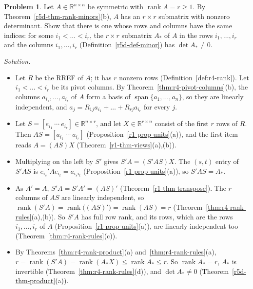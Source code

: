 \documentclass[12pt]{article}
\def\unitnumber{1}
\newcommand{\R}{\mathbb R}
\DeclareMathOperator{\rank}{rank}
\DeclareMathOperator{\Span}{span}
\theoremstyle{definition}
\newtheorem{problem}{Problem}
\newenvironment{solution}{\par\noindent\textit{Solution.}\ }{\par\smallskip}
\begin{document}
\begin{problem}\label{r5d-ex-pr-sym-minor}
Let \(A\in\R^{n\times n}\) be symmetric with \(\rank A=r\geqslant1\). By Theorem~\ref{r5d-thm-rank-minors}(b), \(A\) has an
\(r\times r\) submatrix with nonzero determinant. Show that there is one whose rows and columns have the same indices:
for some \(i_1<\dots<i_r\), the \(r\times r\) submatrix \(A_*\) of \(A\) in the rows \(i_1,\dots,i_r\) and the columns
\(i_1,\dots,i_r\) (Definition~\ref{r5d-def-minor}) has \(\det A_*\ne0\).
\end{problem}
\begin{solution}
\begin{itemize}
\item Let \(R\) be the RREF of \(A\); it has \(r\) nonzero rows (Definition~\ref{def:r4-rank}). Let \(i_1<\dots<i_r\) be its
pivot columns. By Theorem~\ref{thm:r4-pivot-columns}(b), the columns \(a_{i_1},\dots,a_{i_r}\) of \(A\) form a basis of
\(\Span\{a_1,\dots,a_n\}\), so they are linearly independent, and \(a_j=R_{1j}a_{i_1}+\dots+R_{rj}a_{i_r}\) for every \(j\).
\item Let \(S=[e_{i_1}\ \cdots\ e_{i_r}]\in\R^{n\times r}\), and let \(X\in\R^{r\times n}\) consist of the first \(r\) rows of
\(R\). Then \(AS=[a_{i_1}\ \cdots\ a_{i_r}]\) (Proposition~\ref{r1-prop-units}(a)), and the first item reads \(A=(AS)X\)
(Theorem~\ref{r1-thm-views}(a),(b)).
\item Multiplying on the left by \(S'\) gives \(S'A=(S'AS)X\). The \((s,t)\) entry of \(S'AS\) is
\(e_{i_s}'Ae_{i_t}=a_{i_si_t}\) (Proposition~\ref{r1-prop-units}(a)), so \(S'AS=A_*\).
\item As \(A'=A\), \(S'A=S'A'=(AS)'\) (Theorem~\ref{r1-thm-transpose}). The \(r\) columns of \(AS\) are linearly independent,
so \(\rank(S'A)=\rank\bigl((AS)'\bigr)=\rank(AS)=r\) (Theorem~\ref{thm:r4-rank-rules}(a),(b)). So \(S'A\) has full row
rank, and its rows, which are the rows \(i_1,\dots,i_r\) of \(A\) (Proposition~\ref{r1-prop-units}(a)), are linearly
independent too (Theorem~\ref{thm:r4-rank-rules}(c)).
\item By Theorems~\ref{thm:r4-rank-product}(a) and~\ref{thm:r4-rank-rules}(a),
\(r=\rank(S'A)=\rank(A_*X)\leqslant\rank A_*\leqslant r\). So \(\rank A_*=r\), \(A_*\) is invertible
(Theorem~\ref{thm:r4-rank-rules}(d)), and \(\det A_*\ne0\) (Theorem~\ref{r5d-thm-product}(a)).
\end{itemize}
\end{solution}

\clearpage
\def\unitnumber{6}
\setcounter{theorem}{0}\setcounter{problem}{0}
\end{document}
